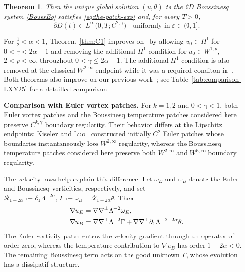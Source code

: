 \documentclass[reqno,11pt,a4paper]{amsart}
\newtheorem{theorem}{Theorem}[section]
\begin{document}
\begin{theorem}
Then the unique global solution $(u,\theta)$
to the 2D Boussinesq system \eqref{BoussEq} satisfies \eqref{eq:the-patch-exp}
and, for every $T>0$,
\begin{equation}\label{eq:reg-parD(t)-1-main}
  \partial D(t) \in L^{\infty}\big(0, T ; C^{2,\gamma}\big)\quad \textrm{uniformly in $\varepsilon \in (0,1]$}.
\end{equation}
\end{theorem}

For $\frac12<\alpha<1$, Theorem~\ref{thm:C1}
improves on~\cite{KX22} by allowing $u_0\in H^1$
for $0<\gamma<2\alpha-1$ and removing the additional
$H^1$ condition for $u_0\in W^{1,p}$, $2<p<\infty$,
throughout $0<\gamma\leq2\alpha-1$.
The additional $H^1$ condition is also removed
at the classical $W^{2,\infty}$ endpoint
while it was a required conditon in~\cite{CMX22}.
Both theorems also improve on our previous
work~\cite{LXY25}; see Table~\ref{tab:comparison-LXY25}
for a detailled comparison.


\medskip
\noindent\textbf{Comparison with Euler vortex patches.}
For $k=1,2$ and $0<\gamma<1$, both Euler vortex patches
and the Boussinesq temperature patches considered here preserve
$C^{k,\gamma}$ boundary regularity.
Their behavior differs at the Lipschitz endpoints:
Kiselev and Luo~\cite{KL23} constructed initially $C^2$
Euler patches whose boundaries instantaneously lose
$W^{2,\infty}$ regularity, whereas the Boussinesq
temperature patches considered here preserve both
$W^{2,\infty}$ and $W^{3,\infty}$ boundary regularity.

The velocity laws help explain this difference.
Let $\omega_E$ and $\omega_B$ denote the Euler
and Boussinesq vorticities, respectively, and set $\mathcal R_{1-2\alpha}:=\partial_1\Lambda^{-2\alpha},\,\Gamma:=\omega_B-\mathcal R_{1-2\alpha}\theta$. 
Then
\begin{align}
  \nabla u_E
  &=\nabla\nabla^\perp\Lambda^{-2}\omega_E,
  \notag\\
  \nabla u_B
  &=\nabla\nabla^\perp\Lambda^{-2}\Gamma
    +\nabla\nabla^\perp\partial_1
      \Lambda^{-2-2\alpha}\theta.
  \label{eq:subcritical}
\end{align}
The Euler  vorticity patch enters the velocity gradient
through an operator of order zero, whereas the temperature
contribution to $\nabla u_B$ has order $1-2\alpha<0$.
The remaining Boussinesq term acts on the good unknown $\Gamma$,
whose evolution has a dissipatif structure.
\end{document}
